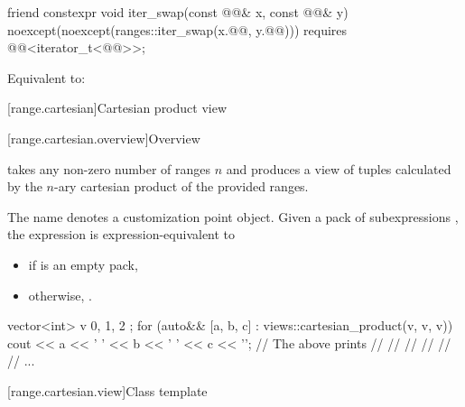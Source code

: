 %
\begin{itemdecl}
friend constexpr void iter_swap(const @@& x, const @@& y)
  noexcept(noexcept(ranges::iter_swap(x.@@, y.@@)))
  requires @@<iterator_t<@@>>;
\end{itemdecl}

\begin{itemdescr}
\pnum
\effects
Equivalent to:
\end{itemdescr}

[range.cartesian]{Cartesian product view}

[range.cartesian.overview]{Overview}

%
\pnum
{} takes any non-zero number of ranges $n$ and
produces a view of tuples calculated by
the $n$-ary cartesian product of the provided ranges.

\pnum
The name  denotes a customization point object.
Given a pack of subexpressions ,
the expression 
is expression-equivalent to
\begin{itemize}
\item
{}
if  is an empty pack,
\item
otherwise,
.
\end{itemize}

\pnum
\begin{example}
\begin{codeblock}
vector<int> v { 0, 1, 2 };
for (auto&& [a, b, c] : views::cartesian_product(v, v, v)) {
  cout << a << ' ' << b << ' ' << c << '\n';
}
// The above prints
// 
// 
// 
// 
// 
// ...
\end{codeblock}
\end{example}

[range.cartesian.view]{Class template }

